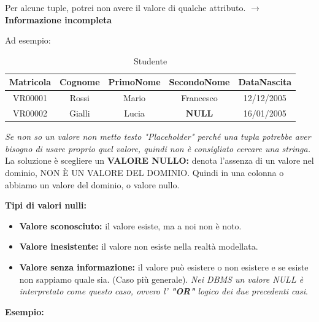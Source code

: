 \documentclass{article}
\begin{document}
    Per alcune tuple, potrei non avere il valore di qualche attributo. $\to$ \textbf{Informazione incompleta}
    
    Ad esempio:
    \begin{table}[h!]
        \centering
        \begin{tabular}{|c|c|c|c|c|}
        \hline
        \textbf{Matricola} & \textbf{Cognome} & \textbf{PrimoNome} & \textbf{SecondoNome} & \textbf{DataNascita}\\
        \hline
         VR00001 & Rossi & Mario & Francesco & 12/12/2005 \\
         \hline
         VR00002 & Gialli & Lucia & $\boldsymbol{NULL}$ & 16/01/2005 \\
         \hline
        \end{tabular}
        \caption{Studente}
        \label{tab:valorinull}
    \end{table}

\textit{Se non so un valore non metto testo "Placeholder" perché una tupla potrebbe aver bisogno di usare proprio quel valore, quindi non è consigliato cercare una stringa.} La soluzione è scegliere un \textbf{VALORE NULLO:} denota l'assenza di un valore nel dominio, NON È UN VALORE DEL DOMINIO. Quindi in una colonna o abbiamo un valore del dominio, o valore nullo.

\textbf{Tipi di valori nulli:}
\begin{itemize}
    \item \textbf{Valore sconosciuto:} il valore esiste, ma a noi non è noto.
    \item \textbf{Valore inesistente:} il valore non esiste nella realtà modellata.
    \item \textbf{Valore senza informazione:} il valore può esistere o non esistere e se esiste non sappiamo quale sia. (Caso più generale). \textit{Nei DBMS un valore NULL è interpretato come questo caso, ovvero l' \textbf{"OR"} logico dei due precedenti casi}.
\end{itemize}

\textbf{Esempio:}
    
\end{document}
